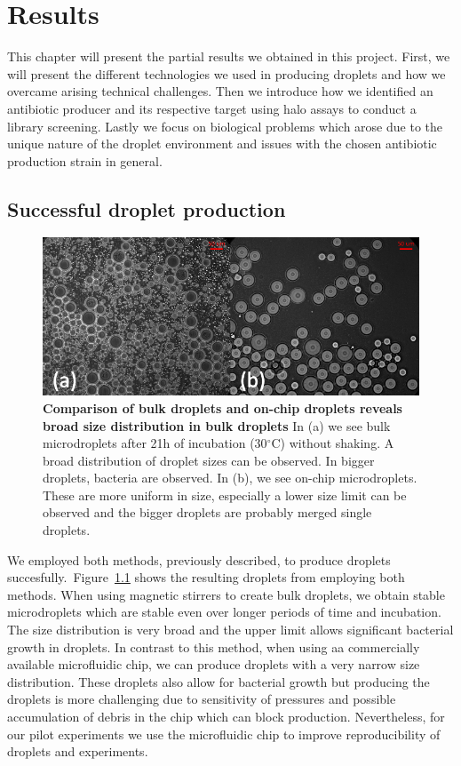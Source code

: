\chapter{Results}

This chapter will present the partial results we obtained in this project. First, we will present the different technologies we used in producing droplets and how we overcame arising technical challenges. Then we introduce how we identified an antibiotic producer and its respective target using halo assays to conduct a library screening. Lastly we focus on biological problems which arose due to the unique nature of the droplet environment and issues with the chosen antibiotic production strain in general. 

\section{Successful droplet production}
\begin{figure}
\centering
\includegraphics[width=\linewidth]{graphics/2025_09_28_droplets_fig3.png}
\caption{\textbf{Comparison of bulk droplets and on-chip droplets reveals broad size distribution in bulk droplets} In (a) we see bulk microdroplets after 21h of incubation (30$^\circ$C) without shaking. A broad distribution of droplet sizes can be observed. In bigger droplets, bacteria are observed. In (b), we see on-chip microdroplets. These are more uniform in size, especially a lower size limit can be observed and the bigger droplets are probably merged single droplets.}
\label{fig:results_droplet_bulk_vs_chip}
\end{figure}
We employed both methods, previously described, to produce droplets succesfully.~Figure~\ref{fig:results_droplet_bulk_vs_chip} shows the resulting droplets from employing both methods. When using magnetic stirrers to create bulk droplets, we obtain stable microdroplets which are stable even over longer periods of time and incubation. The size distribution is very broad and the upper limit allows significant bacterial growth in droplets. In contrast to this method, when using aa commercially available microfluidic chip, we can produce droplets with a very narrow size distribution. These droplets also allow for bacterial growth but producing the droplets is more challenging due to sensitivity of pressures and possible accumulation of debris in the chip which can block production. Nevertheless, for our pilot experiments we use the microfluidic chip to improve reproducibility of droplets and experiments.

